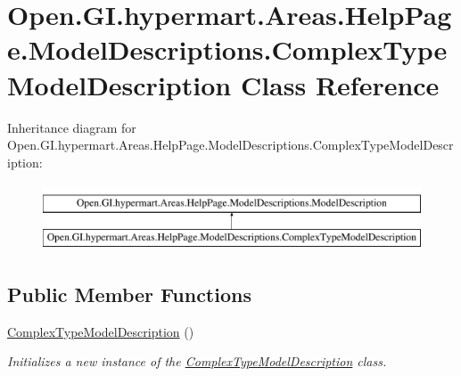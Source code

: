 \hypertarget{class_open_1_1_g_i_1_1hypermart_1_1_areas_1_1_help_page_1_1_model_descriptions_1_1_complex_type_model_description}{}\section{Open.\+G\+I.\+hypermart.\+Areas.\+Help\+Page.\+Model\+Descriptions.\+Complex\+Type\+Model\+Description Class Reference}
\label{class_open_1_1_g_i_1_1hypermart_1_1_areas_1_1_help_page_1_1_model_descriptions_1_1_complex_type_model_description}


 


Inheritance diagram for Open.\+G\+I.\+hypermart.\+Areas.\+Help\+Page.\+Model\+Descriptions.\+Complex\+Type\+Model\+Description\+:\begin{figure}[H]
\begin{center}
\leavevmode
\includegraphics[height=2.000000cm]{class_open_1_1_g_i_1_1hypermart_1_1_areas_1_1_help_page_1_1_model_descriptions_1_1_complex_type_model_description}
\end{center}
\end{figure}
\subsection*{Public Member Functions}
\begin{DoxyCompactItemize}
\item 
\hyperlink{class_open_1_1_g_i_1_1hypermart_1_1_areas_1_1_help_page_1_1_model_descriptions_1_1_complex_type_model_description_a750b8a599e8e45d091aebfb26edfb3cd}{Complex\+Type\+Model\+Description} ()
\begin{DoxyCompactList}\small\item\em Initializes a new instance of the \hyperlink{class_open_1_1_g_i_1_1hypermart_1_1_areas_1_1_help_page_1_1_model_descriptions_1_1_complex_type_model_description}{Complex\+Type\+Model\+Description} class. \end{DoxyCompactList}\end{DoxyCompactItemize}
